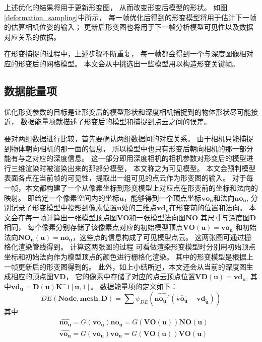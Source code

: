 上述优化的结果将用于更新形变图，
从而改变形变后模型的形状。
如图\ref{deformation_sampling}中所示，
每一帧优化后得到的形变模型将用于估计下一帧的估算相机位姿的输入；
更新后形变图也将用于下一帧分析模型可见性以及数据对应关系的依据。

在形变捕捉的过程中，上述步骤不断重复，
每一帧都会得到一个与深度图像相对应的形变后的网格模型。
本文会从中挑选出一些模型用以构造形变关键帧。
\subsection{数据能量项}
优化形变参数的目标是让形变后的模型形状和深度相机捕捉到的物体形状尽可能接近，
数据能量项就描述了形变后的模型和捕捉到点云之间的误差。

要对两组数据进行比较，首先要确认两组数据间的对应关系。
由于相机只能捕捉到物体朝向相机的那一面的信息，
所以模型中也只有形变后朝向相机的那一部分能有与之对应的深度信息。
这一部分即用深度相机的相机参数对形变后的模型进行三维渲染时被渲染出来的那部分模型，
本文称之为可见模型。
本文会预判模型表面各点在当前帧的可见性，提取出一组可见的点云作为形变图的输入。
对于每一帧，本文都构建了一个从像素坐标到形变模型上对应点在形变前的坐标和法向的映射。
即给定一个像素空间内的坐标$\bm{u}$，能够得到一个顶点坐标$\bm{vo_u}$和法向$\bm{no_u}$,
分别记录了形变模型中投影到像素位置$\bm{u}$处的三维点$\bm{vd_u}$在形变前的位置和法向。
本文会在每一帧计算出一张模型顶点图$\bm{VO}$和一张模型法向图$\bm{NO}$
其尺寸与深度图$\bm{D}$相同，
每个像素分别存储了该像素点对应的初始模型顶点$\bm{VO}(\bm{u})=\bm{vo_u}$
和初始法向$\bm{NO_u}(\bm{u})=\bm{no_u}$，这些点的信息构成了可见模型点云。
这两张图可通过栅格化渲染管线得到。
计算这两张图的过程
可看做渲染形变模型时分别用初始顶点坐标和初始法向作为模型顶点的颜色进行栅格化渲染。
其中的形变模型是根据上一帧更新后的形变图得到的。
此外，如上小结所述，本文还会从当前的深度图生成相应的顶点图$\bm{VD}$，
它的像素中存储了对应的点云顶点位置$\bm{VD}(\bm{u}) = \bm{vd_u}$,
其中$\bm{vd_u}=\bm{D}(\bm{u})\bm{K}^-1[\bm{u},1]$。
数据能量项的定义如下：
\begin{equation}
    DE(\bm{Node},\bm{mesh},\bm{D})=
    \sum \psi_{DE}(
        \hat{\bm{no_u}^T}
        (
            \hat{\bm{vo_u}}
            -
            \bm{vd_{\widetilde{\bm{u}}}}
        )
    )
\end{equation}
其中
\begin{align}
    &\hat{\bm{no_u}}=G(\bm{vo_u})\bm{no_u}=G(\bm{VO}(\bm{u}))\bm{NO}(\bm{u})\\
    &\hat{\bm{vo_u}}=G(\bm{vo_u})\bm{vo_u}=G(\bm{VO}(\bm{u}))\bm{VO}(\bm{u})
\end{align}
